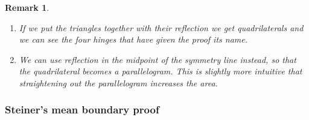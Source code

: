 \documentclass[12pt, a4paper, titlepage]{article}
\newtheorem{remark}{Remark}
\begin{document}
\begin{remark} \
\begin{enumerate}
\item[a)] If we put the triangles together with their reflection we get quadrilaterals and we can see the four hinges that have given the proof its name. 
\item[b)] We can use reflection in the midpoint of the symmetry line instead, so that the quadrilateral becomes a parallelogram. This is slightly more intuitive that straightening out the parallelogram increases the area.
\end{enumerate}

\end{remark}

\subsubsection*{Steiner's mean boundary proof}
\end{document}
